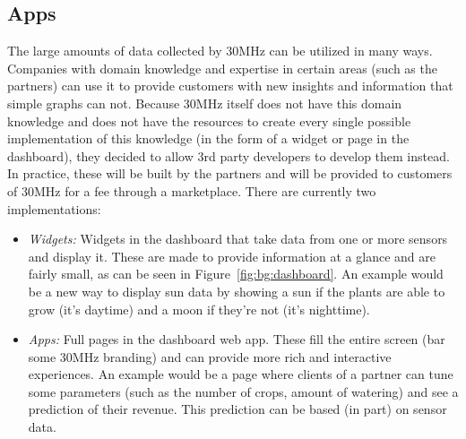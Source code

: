 \subsection{Apps}\label{sec:bg:apps}
The large amounts of data collected by 30MHz can be utilized in many ways. Companies with domain knowledge and expertise in certain areas (such as the partners) can use it to provide customers with new insights and information that simple graphs can not. Because 30MHz itself does not have this domain knowledge and does not have the resources to create every single possible implementation of this knowledge (in the form of a widget or page in the dashboard), they decided to allow 3rd party developers to develop them instead. In practice, these will be built by the partners and will be provided to customers of 30MHz for a fee through a marketplace. There are currently two implementations:

\begin{itemize}
	\item \emph{Widgets:} Widgets in the dashboard that take data from one or more sensors and display it. These are made to provide information at a glance and are fairly small, as can be seen in Figure~\ref{fig:bg:dashboard}. An example would be a new way to display sun data by showing a sun if the plants are able to grow (it's daytime) and a moon if they're not (it's nighttime).
	\item \emph{Apps:} Full pages in the dashboard web app. These fill the entire screen (bar some 30MHz branding) and can provide more rich and interactive experiences. An example would be a page where clients of a partner can tune some parameters (such as the number of crops, amount of watering) and see a prediction of their revenue. This prediction can be based (in part) on sensor data.
\end{itemize}

